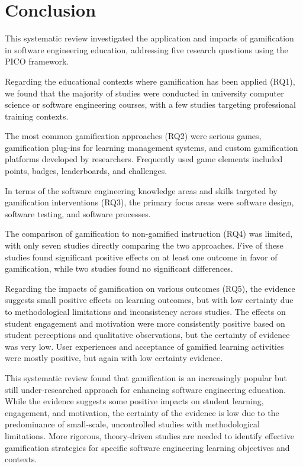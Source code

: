 \documentclass[
	hf,
	]{ceurart}
\begin{document}
		
\section{Conclusion}
This systematic review investigated the application and impacts of gamification in software engineering education, addressing five research questions using the PICO framework. 

Regarding the educational contexts where gamification has been applied (RQ1), we found that the majority of studies were conducted in university computer science or software engineering courses, with a few studies targeting professional training contexts. 

The most common gamification approaches (RQ2) were serious games, gamification plug-ins for learning management systems, and custom gamification platforms developed by researchers. Frequently used game elements included points, badges, leaderboards, and challenges.

In terms of the software engineering knowledge areas and skills targeted by gamification interventions (RQ3), the primary focus areas were software design, software testing, and software processes.

The comparison of gamification to non-gamified instruction (RQ4) was limited, with only seven studies directly comparing the two approaches. Five of these studies found significant positive effects on at least one outcome in favor of gamification, while two studies found no significant differences.

Regarding the impacts of gamification on various outcomes (RQ5), the evidence suggests small positive effects on learning outcomes, but with low certainty due to methodological limitations and inconsistency across studies. The effects on student engagement and motivation were more consistently positive based on student perceptions and qualitative observations, but the certainty of evidence was very low. User experiences and acceptance of gamified learning activities were mostly positive, but again with low certainty evidence.

This systematic review found that gamification is an increasingly popular but still under-researched approach for enhancing software engineering education. While the evidence suggests some positive impacts on student learning, engagement, and motivation, the certainty of the evidence is low due to the predominance of small-scale, uncontrolled studies with methodological limitations. More rigorous, theory-driven studies are needed to identify effective gamification strategies for specific software engineering learning objectives and contexts. 
\end{document}
